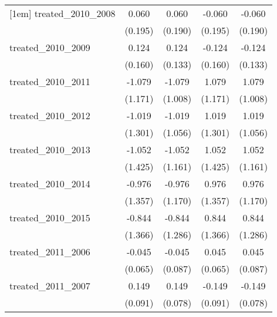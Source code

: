 {\begin{tabular}{l*{4}{c}}
[1em]
treated\_2010\_2008&       0.060         &       0.060         &      -0.060         &      -0.060         \\
            &     (0.195)         &     (0.190)         &     (0.195)         &     (0.190)         \\
[1em]
treated\_2010\_2009&       0.124         &       0.124         &      -0.124         &      -0.124         \\
            &     (0.160)         &     (0.133)         &     (0.160)         &     (0.133)         \\
[1em]
treated\_2010\_2011&      -1.079         &      -1.079         &       1.079         &       1.079         \\
            &     (1.171)         &     (1.008)         &     (1.171)         &     (1.008)         \\
[1em]
treated\_2010\_2012&      -1.019         &      -1.019         &       1.019         &       1.019         \\
            &     (1.301)         &     (1.056)         &     (1.301)         &     (1.056)         \\
[1em]
treated\_2010\_2013&      -1.052         &      -1.052         &       1.052         &       1.052         \\
            &     (1.425)         &     (1.161)         &     (1.425)         &     (1.161)         \\
[1em]
treated\_2010\_2014&      -0.976         &      -0.976         &       0.976         &       0.976         \\
            &     (1.357)         &     (1.170)         &     (1.357)         &     (1.170)         \\
[1em]
treated\_2010\_2015&      -0.844         &      -0.844         &       0.844         &       0.844         \\
            &     (1.366)         &     (1.286)         &     (1.366)         &     (1.286)         \\
[1em]
treated\_2011\_2006&      -0.045         &      -0.045         &       0.045         &       0.045         \\
            &     (0.065)         &     (0.087)         &     (0.065)         &     (0.087)         \\
[1em]
treated\_2011\_2007&       0.149         &       0.149         &      -0.149         &      -0.149         \\
            &     (0.091)         &     (0.078)         &     (0.091)         &     (0.078)         \\

\end{tabular}}
